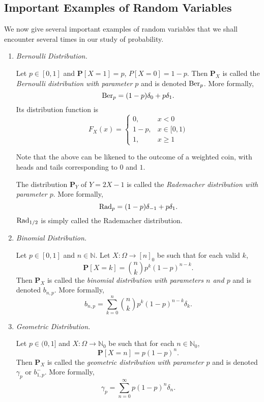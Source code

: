 \subsection{Important Examples of Random Variables}

We now give several important examples of random variables that we shall encounter several times in our study of probability.

\begin{enumerate}
    \item \textit{Bernoulli Distribution.}
    
    Let $p\in[0,1]$ and $\textbf{P}[X=1]=p$, $P[X=0]=1-p$. Then $\textbf{P}_X$ is called the \textit{Bernoulli distribution with parameter $p$} and is denoted $\operatorname{Ber}_p$. More formally,
    $$\operatorname{Ber}_p=(1-p)\delta_0 + p\delta_1.$$
    Its distribution function is
    $$
    F_X(x) = 
    \begin{cases}
    0, &x<0 \\
    1-p, &x\in[0,1) \\
    1, &x\geq 1
    \end{cases}
    $$
    
    Note that the above can be likened to the outcome of a weighted coin, with heads and tails corresponding to $0$ and $1$.
    
    \vspace{2mm}
    The distribution $\textbf{P}_Y$ of $Y=2X-1$ is called the \textit{Rademacher distribution with parameter $p$}. More formally,
    $$\operatorname{Rad}_p = (1-p)\delta_{-1}+p\delta_1.$$
    $\operatorname{Rad}_{1/2}$ is simply called the Rademacher distribution.
    
    \item \textit{Binomial Distribution.}
    
    Let $p\in[0,1]$ and $n\in\mathbb{N}$. Let $X:\Omega\to[n]_0$ be such that for each valid $k$,
    $$\textbf{P}[X=k]=\binom{n}{k}p^k(1-p)^{n-k}.$$
    Then $\textbf{P}_X$ is called the \textit{binomial distribution with parameters $n$ and $p$} and is denoted $b_{n,p}$. More formally,
    $$b_{n,p}=\sum_{k=0}^n \binom{n}{k}p^k(1-p)^{n-k}\delta_k.$$
    
    \item \textit{Geometric Distribution.}
    
    Let $p\in(0,1]$ and $X:\Omega\to\mathbb{N}_0$ be such that for each $n\in\mathbb{N}_0$,
    $$\textbf{P}[X=n]=p(1-p)^n.$$
    Then $\textbf{P}_X$ is called the \textit{geometric distribution with parameter $p$} and is denoted $\gamma_p$ or $b_{1,p}^{-}$. More formally,
    $$\gamma_p=\sum_{n=0}^\infty p(1-p)^n\delta_n.$$
    

\end{enumerate}
